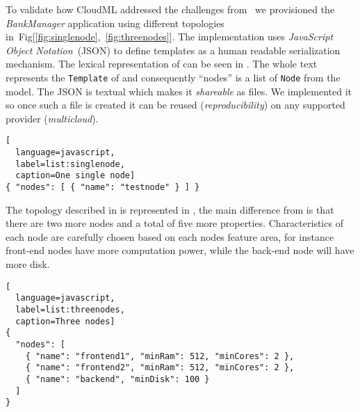 % 



To validate how CloudML addressed the challenges from~
we provisioned the \emph{BankManager} application using different topologies in~Fig[\ref{fig:singlenode},~\ref{fig:threenodes}].
The implementation uses \emph{JavaScript Object Notation}~(JSON) to define templates
as a human readable serialization mechanism.
The lexical representation of  can be seen in . 
The whole text represents the \texttt{Template} of  and consequently 
``nodes'' is a list of \texttt{Node} from the model.
The JSON is textual which makes it \emph{shareable} as files.
We implemented it so once such a file is created it can be reused (\emph{reproducibility}) 
on any supported provider (\emph{multicloud}).

\begin{lstlisting}[
  language=javascript,
  label=list:singlenode,
  caption=One single node]
{ "nodes": [ { "name": "testnode" } ] }
\end{lstlisting}

The topology described in  is represented in ,
the main difference from  is that there are two more nodes and a total of 
five more properties.
Characteristics of each node are carefully chosen based on each nodes feature area, for instance 
front-end nodes have more computation power, while the back-end node will have more disk.

\begin{lstlisting}[
  language=javascript,
  label=list:threenodes,
  caption=Three nodes]
{
  "nodes": [ 
    { "name": "frontend1", "minRam": 512, "minCores": 2 },
    { "name": "frontend2", "minRam": 512, "minCores": 2 },
    { "name": "backend", "minDisk": 100 }
  ]
}
\end{lstlisting}
